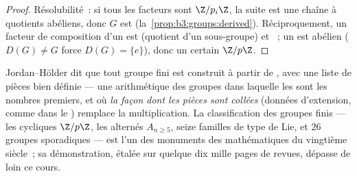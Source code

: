 \begin{proof}
Résolubilité~: si tous les facteurs sont $\Z/p_i\Z$, la suite est
une chaîne à quotients abéliens, donc $G$ est 
(la~\cref{prop:b3:groups:derived}). Réciproquement, un facteur de
composition d'un  est  (quotient d'un
sous-groupe) et ~; un   est abélien
($D(G) \ne G$ force $D(G) = \{e\}$), donc un certain $\Z/p\Z$.
\end{proof}

\begin{remark}\label{rem:b3:groups:jhmeaning}
Jordan--Hölder dit que tout groupe fini est construit à partir de
, avec une liste de pièces bien définie --- une
arithmétique des groupes dans laquelle les  sont
les nombres premiers, et où \emph{la façon dont les pièces sont
collées} (données d'extension, comme dans le ) remplace la  multiplication. La classification
des groupes finis  --- les cycliques $\Z/p\Z$, les
alternés $A_{n \geq 5}$, seize familles de type de Lie, et $26$
groupes sporadiques --- est l'un des monuments des mathématiques
du vingtième siècle~; sa démonstration, étalée sur quelque dix
mille pages de revues, dépasse de loin ce cours.
\end{remark}

